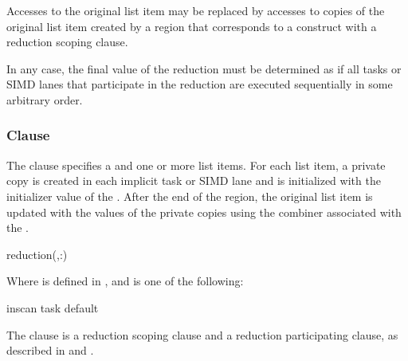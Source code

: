 Accesses to the original list item may be replaced by accesses to copies of the
original list item created by a region that corresponds to a construct with a
reduction scoping clause.

In any case, the final value of the reduction must be determined as if all tasks
or SIMD lanes that participate in the reduction are executed sequentially in
some arbitrary order.



\subsubsection{ Clause}
\label{subsubsec:reduction clause}
\summary
The  clause specifies a  and one or
more list items. For each list item, a private copy is created in each implicit
task or SIMD lane and is initialized with the initializer value of the
. After the end of the region, the original list item
is updated with the values of the private copies using the combiner associated
with the .

\syntax
\begin{ompSyntax}
reduction(\plc{[ reduction-modifier},\plc{]reduction-identifier }:)
\end{ompSyntax}

Where  is defined in 
, and
 is one of the following:
\begin{indentedcodelist}
inscan
task
default
\end{indentedcodelist}

\descr
The  clause is a reduction scoping clause and a reduction
participating clause, as described in  
and . 

